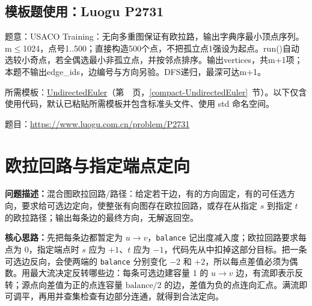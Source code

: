 \Needspace{479pt}



\newpage



\Needspace{381pt}

\subsection*{模板题使用：Luogu P2731}

\label{usage-example-177}

题意：USACO Training：无向多重图保证有欧拉路，输出字典序最小顶点序列。m$\le$1024，点号1..500；直接构造500个点，不把孤立点1强设为起点。run()自动选较小奇点，若全偶选最小非孤立点，并按邻点排序。输出vertices，共m+1项；本题不输出edge\_ids，边编号与方向另验。DFS递归，最深可达m+1。

所需模板：\hyperref[compact-UndirectedEuler]{UndirectedEuler}（第~\pageref{compact-UndirectedEuler}~页，\ref{compact-UndirectedEuler}~节）。以下仅含使用代码，默认已粘贴所需模板并包含标准头文件、使用 std 命名空间。

题目：\url{https://www.luogu.com.cn/problem/P2731}



\Needspace{558pt}

\section{欧拉回路与指定端点定向}\label{compact-mixed_euler_orientation}

\noindent\textbf{问题描述：}\allowbreak 混合图欧拉回路/路径：给定若干边，有的方向固定，有的可任选方向，要求给可选边定向，使整张有向图存在欧拉回路，或存在从指定 $s$ 到指定 $t$ 的欧拉路径；输出每条边的最终方向，无解返回空。

\textbf{核心思路：}\allowbreak 先把每条边都暂定为 $u\to v$，\texttt{balance} 记出度减入度；欧拉回路要求每点为 0，指定端点时 $s$ 应为 $+1$、$t$ 应为 $-1$，代码先从中扣掉这部分目标。把一条可选边反向，会使两端的 \texttt{balance} 分别变化 $-2$ 和 $+2$，所以每点差值必须为偶数。用最大流决定反转哪些边：每条可选边建容量 1 的 $u\to v$ 边，有流即表示反转；源点向差值为正的点连容量 $\mathrm{balance}/2$ 的边，差值为负的点连向汇点。满流即可调平，再用并查集检查有边部分连通，就得到合法定向。

